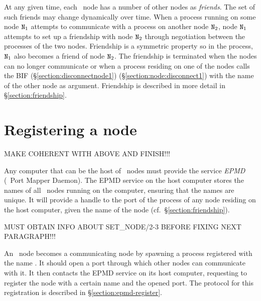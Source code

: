 At any given time, each \Erlang\ node has a number of other nodes as
\emph{friends}.  The set of such friends may change dynamically over time.
When a process running on some node ${\tt{\sl N}}_1$ attempts to communicate with
a process
on another node ${\tt{\sl N}}_2$, node ${\tt{\sl N}}_1$
attempts to set up a friendship with node ${\tt{\sl N}}_2$ through negotiation
between the 
processes of the two nodes.  Friendship is a
symmetric property so in the process, ${\tt{\sl N}}_1$
also becomes a friend of node ${\tt{\sl N}}_2$.  The friendship is terminated
when the nodes can no longer communicate or when a process residing on one
of the nodes calls the BIF
\ifOld {} (\S\ref{section:disconnectnode1}) \fi
\ifStd {}
(\S\ref{section:node:disconnect1}) \fi
with the name of the other node as argument.
Friendship is described in more detail in \S\ref{section:friendship}.

\section{Registering a node}

\label{section:registering-nodes}

MAKE COHERENT WITH ABOVE AND FINISH!!!

Any computer that can be the host of \Erlang\ nodes must provide the service
\emph{EPMD} (\Erlang\ Port Mapper Daemon).
The EPMD service on the host computer
stores the names of all \Erlang\ nodes running on the computer, ensuring that
the names are unique.  It will provide a handle to the port of the 
process of any node residing on the host computer, given the name of the node
(cf.\ \S\ref{section:friendship}).

MUST OBTAIN INFO ABOUT SET_NODE/2-3 BEFORE FIXING NEXT PARAGRAPH!!!

An \Erlang\ node becomes a communicating node by spawning a process registered
with the name .  It should
open a port through which other nodes can communicate with it.  It then
contacts the
EPMD service on its host computer, requesting to register the node with a certain
name and the opened port.  The protocol for this registration is described
in \S\ref{section:epmd-register}.


